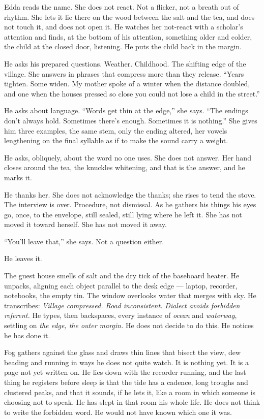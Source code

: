 \documentclass[11pt,oneside]{book}
\newcommand{\sceneline}{%
  \par\vspace{1.2em}
  \begin{center}
    \fontsize{11}{11}\selectfont \textbullet\quad\textbullet\quad\textbullet
  \end{center}
  \vspace{0.6em}\noindent\ignorespaces
}
\begin{document}
Edda reads the name. She does not react. Not a flicker, not a breath out
of rhythm. She lets it lie there on the wood between the salt and the
tea, and does not touch it, and does not open it. He watches her
not-react with a scholar's attention and finds, at the bottom of his
attention, something older and colder, the child at the closed door,
listening. He puts the child back in the margin.

He asks his prepared questions. Weather. Childhood. The shifting edge of
the village. She answers in phrases that compress more than they
release. ``Years tighten. Some widen. My mother spoke of a winter when
the distance doubled, and one when the houses pressed so close you could
not lose a child in the street.''

He asks about language. ``Words get thin at the edge,'' she says. ``The
endings don't always hold. Sometimes there's enough. Sometimes it is
nothing.'' She gives him three examples, the same stem, only the ending
altered, her vowels lengthening on the final syllable as if to make the
sound carry a weight.

He asks, obliquely, about the word no one uses. She does not answer. Her
hand closes around the tea, the knuckles whitening, and that is the
answer, and he marks it.

He thanks her. She does not acknowledge the thanks; she rises to tend
the stove. The interview is over. Procedure, not dismissal. As he
gathers his things his eyes go, once, to the envelope, still sealed,
still lying where he left it. She has not moved it toward herself. She
has not moved it away.

``You'll leave that,'' she says. Not a question either.

He leaves it.

\sceneline

The guest house smells of salt and the dry tick of the baseboard heater.
He unpacks, aligning each object parallel to the desk edge --- laptop,
recorder, notebooks, the empty tin. The window overlooks water that
merges with sky. He transcribes: \emph{Village compressed. Road
inconsistent. Dialect avoids forbidden referent.} He types, then
backspaces, every instance of \emph{ocean} and \emph{waterway}, settling
on \emph{the edge, the outer margin.} He does not decide to do this. He
notices he has done it.

Fog gathers against the glass and draws thin lines that bisect the view,
dew beading and running in ways he does not quite watch. It is nothing
yet. It is a page not yet written on. He lies down with the recorder
running, and the last thing he registers before sleep is that the tide
has a cadence, long troughs and clustered peaks, and that it sounds, if
he lets it, like a room in which someone is choosing not to speak. He
has slept in that room his whole life. He does not think to write the
forbidden word. He would not have known which one it was.
\end{document}
